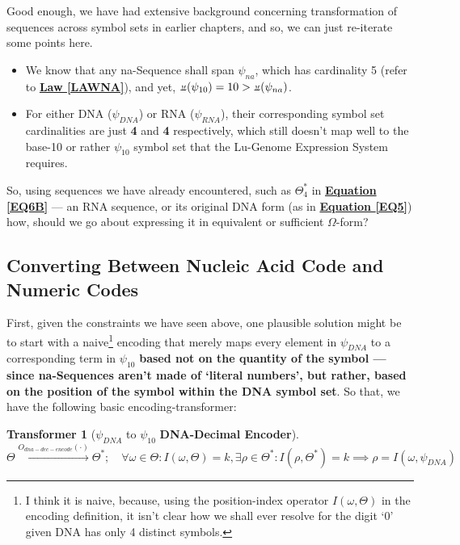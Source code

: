 \documentclass[a4paper, 18pt]{book} %
\newtheorem{transf}{Transformer}
\newcommand{\invpi}{\rotatebox[origin=c]{180}{$\pi$}}
\begin{document}
Good enough, we have had extensive background concerning transformation of sequences across symbol sets in earlier chapters, and so, we can just re-iterate some points here.

\begin{itemize}
\item We know that any na-Sequence shall span $\psi_{na}$, which has cardinality 5 (refer to \textbf{\hyperref[LAWNA]{Law \ref{LAWNA}}}), and yet, $\invpi(\psi_{10}) = 10 > \invpi(\psi_{na})$.
\item For either DNA ($\psi_{DNA}$) or RNA ($\psi_{RNA}$), their corresponding symbol set cardinalities are just \textbf{4} and \textbf{4} respectively, which still doesn't map well to the base-10 or rather $\psi_{10}$ symbol set that the Lu-Genome Expression System requires.
\end{itemize}

So, using sequences we have already encountered, such as $\Theta_4^*$ in \textbf{\hyperref[EQ6B]{Equation \ref{EQ6B}}} --- an RNA sequence, or its original DNA form (as in \textbf{\hyperref[EQ5]{Equation \ref{EQ5}}}) how, should we go about expressing it in equivalent or sufficient $\Omega$-form?

\subsection{Converting Between Nucleic Acid Code and Numeric Codes}

First, given the constraints we have seen above, one plausible solution might be to start with a naive\footnote{I think it is naive, because, using the position-index operator $I(\omega,\Theta)$ in the encoding definition, it isn't clear how we shall ever resolve for the digit `0' given DNA has only 4 distinct symbols.} encoding that merely maps every element in $\psi_{DNA}$ to a corresponding term in $\psi_{10}$ \textbf{based not on the quantity of the symbol --- since na-Sequences aren't made of `literal numbers', but rather, based on the position of the symbol within the DNA symbol set}. So that, we have the following basic encoding-transformer:


\begin{transf}[$\psi_{DNA}$ to $\psi_{10}$ \textbf{DNA-Decimal Encoder}]
\label{TRANSFDNADECEN}
$ $\\
$\Theta \xrightarrow{O_{dna-dec-encode}(\cdot)} \Theta^*; \quad \forall \omega \in \Theta: I(\omega,\Theta) = k, \exists \rho \in \Theta^*: I(\rho,\Theta^*) = k \implies \rho = I(\omega,\psi_{DNA})$
\end{transf}
\end{document}
